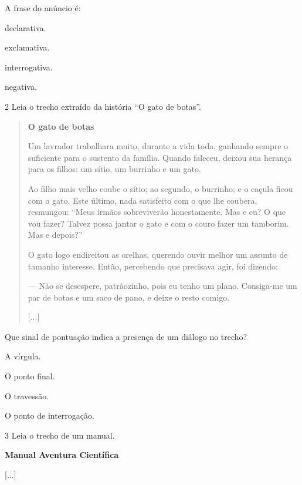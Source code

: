 A frase do anúncio é:

\begin{escolha}
\item
  declarativa.
\item
  exclamativa.
\item
  interrogativa.
\item
  negativa.
\end{escolha}

\num{2} Leia o trecho extraído da história ``O gato de botas''.

\begin{quote}
\textbf{O gato de botas}

Um lavrador trabalhara muito, durante a vida toda, ganhando sempre o
suficiente para o sustento da família. Quando faleceu, deixou sua
herança para os filhos: um sítio, um burrinho e um gato.

Ao filho mais velho coube o sítio; ao segundo, o burrinho; e o caçula
ficou com o gato. Este último, nada satisfeito com o que lhe coubera,
resmungou: ``Meus irmãos sobreviverão honestamente. Mas e eu? O que vou
fazer? Talvez possa jantar o gato e com o couro fazer um tamborim. Mas e
depois?''

O gato logo endireitou as orelhas, querendo ouvir melhor um assunto de
tamanho interesse. Então, percebendo que precisava agir, foi dizendo:

--- Não se desespere, patrãozinho, pois eu tenho um plano. Consiga-me um
par de botas e um saco de pano, e deixe o resto comigo.

{[}...{]}

\end{quote}

Que sinal de pontuação indica a presença de um diálogo no trecho?

\begin{escolha}
\item
  A vírgula.
\item
  O ponto final.
\item
  O travessão.
\item
  O ponto de interrogação.
\end{escolha}


\num{3} Leia o trecho de um manual.

\textbf{Manual Aventura Científica}

{[}...{]}

